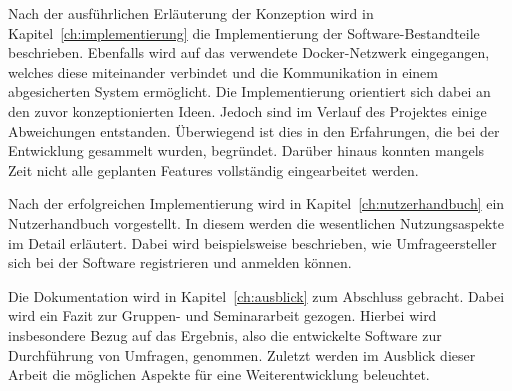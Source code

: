 Nach der ausführlichen Erläuterung der Konzeption wird in Kapitel~\vref{ch:implementierung} die Implementierung der Software-Bestandteile beschrieben. 
Ebenfalls wird auf das verwendete Docker-Netzwerk eingegangen, welches diese miteinander verbindet und die Kommunikation in einem abgesicherten System ermöglicht.
Die Implementierung orientiert sich dabei an den zuvor konzeptionierten Ideen.
Jedoch sind im Verlauf des Projektes einige Abweichungen entstanden.
Überwiegend ist dies in den Erfahrungen, die bei der Entwicklung gesammelt wurden, begründet.
Darüber hinaus konnten mangels Zeit nicht alle geplanten Features vollständig eingearbeitet werden.

Nach der erfolgreichen Implementierung wird in Kapitel~\vref{ch:nutzerhandbuch} ein Nutzerhandbuch vorgestellt. 
In diesem werden die wesentlichen Nutzungsaspekte im Detail erläutert.
Dabei wird beispielsweise beschrieben, wie Umfrageersteller sich bei der Software registrieren und anmelden können.

Die Dokumentation wird in Kapitel~\vref{ch:ausblick} zum Abschluss gebracht. 
Dabei wird ein Fazit zur Gruppen- und Seminararbeit gezogen.
Hierbei wird insbesondere Bezug auf das Ergebnis, also die entwickelte Software zur Durchführung von Umfragen, genommen.
Zuletzt werden im Ausblick dieser Arbeit die möglichen Aspekte für eine Weiterentwicklung beleuchtet.

